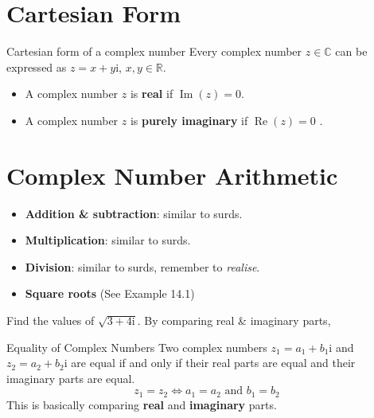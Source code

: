 \clearpage
{}
\section{Cartesian Form}
\begin{definition}{Cartesian form of a complex number}
Every complex number $z\in\mathbb{C}$ can be expressed as $z=x+y\mathrm{i}$, $x,y\in\mathbb{R}$.
\begin{itemize}
\item A complex number $z$ is \textbf{real} if $\operatorname{Im}(z)=0$.
\item A complex number $z$ is \textbf{purely imaginary} if $\operatorname{Re}(z)=0$ .
\end{itemize}
\end{definition}
\section{Complex Number Arithmetic}
\begin{itemize}
\item \textbf{Addition \& subtraction}: similar to surds.
\item \textbf{Multiplication}: similar to surds.
\item \textbf{Division}: similar to surds, remember to \textit{realise}.
\item \textbf{Square roots} (See Example 14.1)
\end{itemize}
\exlab
Find the values of $\sqrt{3+4\mathrm{i}}$. 
By comparing real \& imaginary parts,
\begin{theorem}{Equality of Complex Numbers}
Two complex numbers $z_{1}=a_{1}+b_{1}\mathrm{i}$ and $z_{2}=a_{2}+b_{2}\mathrm{i}$ are equal if and only if their real parts are equal and their imaginary parts are equal.
\[z_{1}=z_{2}\iff a_{1}=a_{2}\text{ and }b_{1}=b_{2}\]
This is basically comparing \textbf{real} and \textbf{imaginary} parts.
\end{theorem}

